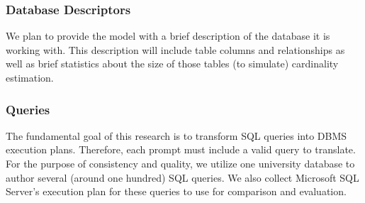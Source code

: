 \subsubsection{Database Descriptors}
We plan to provide the model with a brief description of the database it is working with. This description will include table columns and relationships as well as brief statistics about the size of those tables (to simulate) cardinality estimation.

\subsubsection{Queries}
The fundamental goal of this research is to transform SQL queries into DBMS execution plans. Therefore, each prompt must include a valid query to translate. For the purpose of consistency and quality, we utilize one university database to author several (around one hundred) SQL queries. We also collect Microsoft SQL Server's execution plan for these queries to use for comparison and evaluation.

